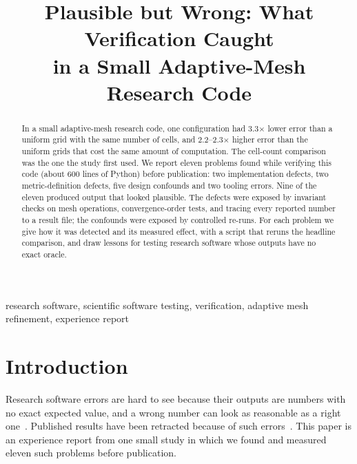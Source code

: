 \documentclass[conference]{IEEEtran}
\begin{document}
\title{Plausible but Wrong: What Verification Caught\\in a Small Adaptive-Mesh Research Code}

\author{
}

\maketitle

\begin{abstract}
In a small adaptive-mesh research code, one configuration had 3.3$\times$
lower error than a uniform grid with the same number of cells, and
2.2--2.3$\times$ higher error than the uniform grids that cost the same
amount of computation. The cell-count comparison was the one the study first
used. We report eleven problems found while verifying this code (about 600
lines of Python) before publication: two implementation defects, two
metric-definition defects, five design confounds and two tooling errors.
Nine of the eleven produced output that looked plausible. The defects were
exposed by invariant checks on mesh operations, convergence-order tests,
and tracing every reported number to a result file; the confounds were
exposed by controlled re-runs. For each problem we give how it was detected
and its measured effect, with a script that reruns the headline comparison,
and draw lessons for testing research software whose outputs have no exact
oracle.
\end{abstract}

\begin{IEEEkeywords}
research software, scientific software testing, verification, adaptive mesh refinement, experience report
\end{IEEEkeywords}

\section{Introduction}
Research software errors are hard to see because their outputs are numbers
with no exact expected value, and a wrong number can look as reasonable as a
right one~\cite{hatton1994,kanewala2014}. Published results have been
retracted because of such errors~\cite{miller2006}. This paper is an
experience report from one small study in which we found and measured
eleven such problems before publication.
\end{document}

